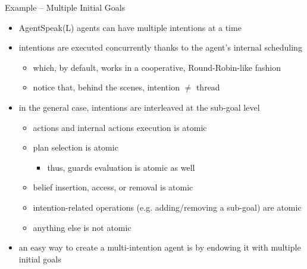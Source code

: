 \documentclass[presentation]{beamer}\mode<presentation>{\usetheme{AMSBolognaFC}}
\begin{document}
\begin{frame}[c, allowframebreaks]{Example \theJasonExample{} -- Multiple Initial Goals}
    \begin{itemize}
        \item AgentSpeak(L) agents can have multiple \alert{intentions} at a time
        
        \vspace{.3cm}
        
        \item intentions are executed concurrently thanks to the agent's internal scheduling
        \begin{itemize}
            \item which, by default, works in a cooperative, Round-Robin-like fashion
            \item notice that, behind the scenes, intention $\neq$ thread
        \end{itemize}
        
        \vspace{.3cm}
        
        \item in the general case, intentions are \alert{interleaved} at the sub-goal level
        \begin{itemize}
            \item actions and internal actions execution is \alert{atomic}
            \item plan selection is atomic
            \begin{itemize}
                \item thus, guards evaluation is atomic as well
            \end{itemize}
            \item belief insertion, access, or removal is atomic
            \item intention-related operations (e.g. adding/removing a sub-goal) are atomic
            \item anything else is not atomic
        \end{itemize}
        
        \vspace{.3cm}
        
        \item an easy way to create a multi-intention agent is by endowing it with multiple \alert{initial goals}
        
        \vspace{.3cm}
        

\end{itemize}
\end{frame}
\end{document}
